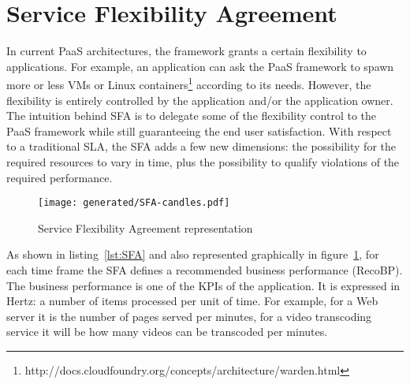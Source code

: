 \section{Service Flexibility Agreement}
\label{sec:sfa}

In current PaaS architectures, the framework grants a certain flexibility to applications.
For example, an application can ask the PaaS framework to spawn more or less VMs or Linux containers\footnote{http://docs.cloudfoundry.org/concepts/architecture/warden.html} according to its needs.
However, the flexibility is entirely controlled by the application and/or the application owner.
The intuition behind SFA is to delegate some of the flexibility control to the PaaS framework while still guaranteeing the end user satisfaction.
With respect to a traditional SLA, the SFA adds a few new dimensions: the possibility for the required resources to vary in time, plus the possibility to qualify violations of the required performance.

\begin{figure}[h]
\centering
\texttt{[image: generated/SFA-candles.pdf]}
\caption{Service Flexibility Agreement representation}
\label{fig:SFA}
\end{figure}


As shown in listing~\ref{lst:SFA} and also represented graphically in figure~\ref{fig:SFA}, for each time frame the SFA defines a recommended business performance (RecoBP). 
The business performance is one of the KPIs of the application.
It is expressed in Hertz: a number of items processed per unit of time.
For example, for a Web server it is the number of pages served per minutes, for a video transcoding service it will be how many videos can be transcoded per minutes.

